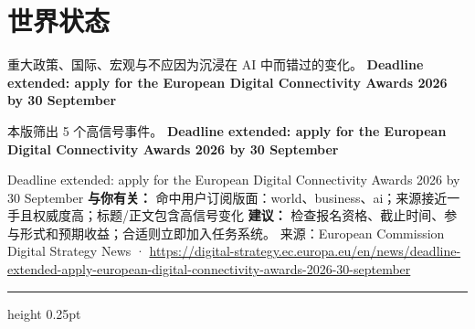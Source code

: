 \documentclass[10.5pt]{ctexart}
\begin{document}
\section*{世界状态}
{\color{ormuted} 重大政策、国际、宏观与不应因为沉浸在 AI 中而错过的变化。}
\vspace{2mm}
{\LARGE\bfseries Deadline extended: apply for the European Digital Connectivity Awards 2026 by 30 September}\par
\vspace{1mm}
{\color{ormuted} 本版筛出 5 个高信号事件。}
\vspace{3mm}
{\Large\bfseries Deadline extended: apply for the European Digital Connectivity Awards 2026 by 30 September}\par
Deadline extended: apply for the European Digital Connectivity Awards 2026 by 30 September
\textbf{与你有关：} 命中用户订阅版面：world、business、ai；来源接近一手且权威度高；标题/正文包含高信号变化
\textbf{建议：} 检查报名资格、截止时间、参与形式和预期收益；合适则立即加入任务系统。
{\footnotesize\color{ormuted} 来源：European Commission Digital Strategy News · \url{https://digital-strategy.ec.europa.eu/en/news/deadline-extended-apply-european-digital-connectivity-awards-2026-30-september}}
\vspace{4mm}
\hrule height 0.25pt
\vspace{3mm}
\end{document}
